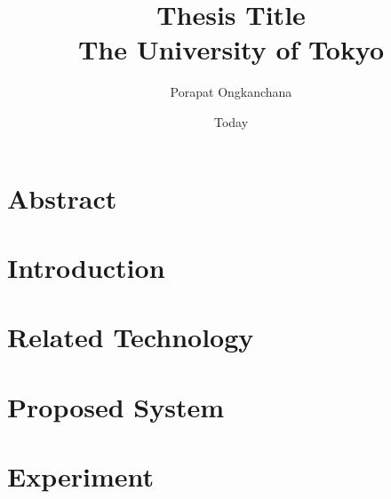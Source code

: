 \documentclass[12pt]{report}
\title{
    {Thesis Title} \\
    {\large The University of Tokyo}\\
}
\author{Porapat Ongkanchana}
\date{Today}
\begin{document}


\chapter*{Abstract}
 

\tableofcontents
\listoffigures

\chapter{Introduction} 


\chapter{Related Technology}


\chapter{Proposed System}


\chapter{Experiment}

\end{document}
